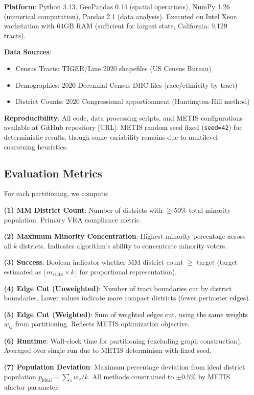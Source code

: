\textbf{Platform}: Python 3.13, GeoPandas 0.14 (spatial operations), NumPy 1.26 (numerical computation), Pandas 2.1 (data analysis). Executed on Intel Xeon workstation with 64GB RAM (sufficient for largest state, California: 9,129 tracts).

\textbf{Data Sources}:
\begin{itemize}
\item Census Tracts: TIGER/Line 2020 shapefiles (US Census Bureau)
\item Demographics: 2020 Decennial Census DHC files (race/ethnicity by tract)
\item District Counts: 2020 Congressional apportionment (Huntington-Hill method)
\end{itemize}

\textbf{Reproducibility}: All code, data processing scripts, and METIS configurations available at GitHub repository [URL]. METIS random seed fixed (\texttt{seed=42}) for deterministic results, though some variability remains due to multilevel coarsening heuristics.

\subsection{Evaluation Metrics}

For each partitioning, we compute:

\textbf{(1) MM District Count}: Number of districts with $\geq 50\%$ total minority population. Primary VRA compliance metric.

\textbf{(2) Maximum Minority Concentration}: Highest minority percentage across all $k$ districts. Indicates algorithm's ability to concentrate minority voters.

\textbf{(3) Success}: Boolean indicator whether MM district count $\geq$ target (target estimated as $\lfloor m_{\text{state}} \times k \rfloor$ for proportional representation).

\textbf{(4) Edge Cut (Unweighted)}: Number of tract boundaries cut by district boundaries. Lower values indicate more compact districts (fewer perimeter edges).

\textbf{(5) Edge Cut (Weighted)}: Sum of weighted edges cut, using the same weights $w_{ij}$ from partitioning. Reflects METIS optimization objective.

\textbf{(6) Runtime}: Wall-clock time for partitioning (excluding graph construction). Averaged over single run due to METIS determinism with fixed seed.

\textbf{(7) Population Deviation}: Maximum percentage deviation from ideal district population $p_{\text{ideal}} = \sum_v w_v / k$. All methods constrained to $\pm 0.5\%$ by METIS ufactor parameter.

